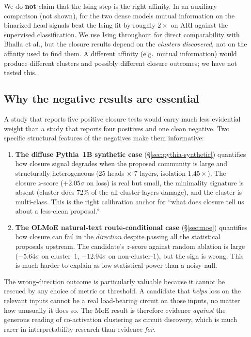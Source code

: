 \documentclass[11pt]{article}
\begin{document}
We do \textbf{not} claim that the Ising step is the right affinity. In an
auxiliary comparison (not shown), for the two dense models mutual
information on the binarized head signals beat the Ising fit by roughly
$2\times$ on ARI against the supervised classification. We use Ising
throughout for direct comparability with Bhalla et al., but the closure
results depend on the \emph{clusters discovered}, not on the affinity used
to find them. A different affinity (e.g.\ mutual information) would
produce different clusters and possibly different closure outcomes; we
have not tested this.

\subsection{Why the negative results are essential}

A study that reports five positive closure tests would carry much less
evidential weight than a study that reports four positives and one clean
negative. Two specific structural features of the negatives make them
informative:

\begin{enumerate}
\item \textbf{The diffuse Pythia~1B synthetic case} (\S\ref{sec:pythia-synthetic})
  quantifies how closure signal degrades when the proposed community is
  large and structurally heterogeneous (25 heads $\times$ 7 layers,
  isolation $1.45\times$). The closure $z$-score ($+2.05\sigma$ on loss)
  is real but small, the minimality signature is absent (cluster does
  $72\%$ of the all-cluster-layers damage), and the cluster is
  multi-class. This is the right calibration anchor for ``what does
  closure tell us about a less-clean proposal.''

\item \textbf{The OLMoE natural-text route-conditional case}
  (\S\ref{sec:moe}) quantifies how closure can fail in the
  \emph{direction} despite passing all the statistical proposals upstream.
  The candidate's $z$-score against random ablation is large
  ($-5.64\sigma$ on cluster~1, $-12.94\sigma$ on non-cluster-1), but the
  sign is wrong. This is much harder to explain as low statistical power
  than a noisy null.
\end{enumerate}

The wrong-direction outcome is particularly valuable because it cannot be
rescued by any choice of metric or threshold. A candidate that
\emph{helps} loss on the relevant inputs cannot be a real load-bearing
circuit on those inputs, no matter how unusually it does so. The MoE
result is therefore evidence \emph{against} the generous reading of
co-activation clustering as circuit discovery, which is much rarer in
interpretability research than evidence \emph{for}.
\end{document}
